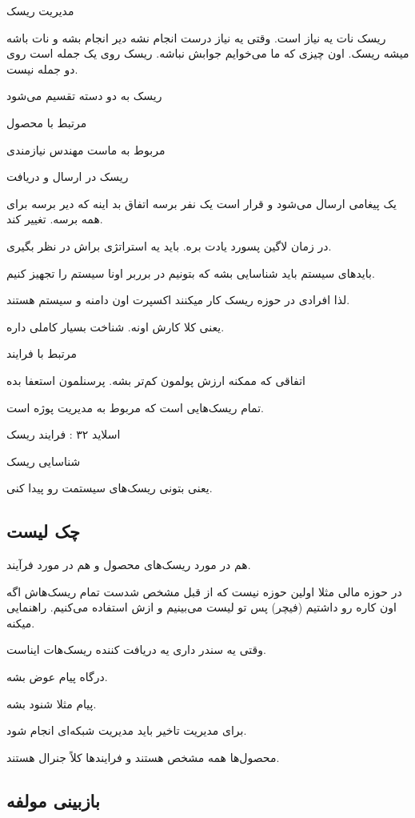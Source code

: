 
مدیریت ریسک

ریسک نات یه نیاز است. وقتی یه نیاز درست انجام نشه دیر انجام بشه و نات باشه میشه
ریسک. اون چیزی که ما می‌خوایم جوابش نباشه. ریسک روی یک جمله است روی دو جمله
نیست.

ریسک به دو دسته تقسیم می‌شود

مرتبط با محصول

مربوط به ماست
مهندس نیازمندی

ریسک در ارسال و دریافت

یک پیغامی ارسال می‌شود و قرار است یک نفر برسه
اتفاق بد اینه که دیر برسه
برای همه برسه.
تغییر کند.

در زمان لاگین پسورد یادت بره. باید یه استراتژی براش در نظر بگیری.

باید‌های سیستم باید شناسایی بشه که بتونیم در برربر اونا سیستم را تجهیز کنیم.

لذا افرادی در حوزه ریسک کار میکنند اکسپرت اون دامنه و سیستم هستند.

یعنی کلا کارش اونه. شناخت بسیار کاملی داره.

مرتبط با فرایند

اتفاقی که ممکنه ارزش پولمون کم‌تر بشه.
پرسنلمون استعفا بده

تمام ریسک‌هایی است که مربوط به مدیریت پوژه است.

اسلاید ۳۲ : فرایند ریسک

شناسایی ریسک

یعنی بتونی ریسک‌های سیستمت رو پیدا کنی.

\subsection{چک لیست}

هم در مورد ریسک‌های محصول و هم در مورد فرآیند.

در حوزه مالی مثلا اولین حوزه نیست که از قبل مشخص شدست تمام ریسک‌هاش
اگه اون کاره رو داشتیم (فیچر) پس تو لیست می‌بینیم و ازش استفاده می‌کنیم.
راهنمایی میکنه.

وقتی یه سندر داری یه دریافت کننده ریسک‌هات ایناست.

درگاه پیام عوض بشه.

پیام مثلا شنود بشه.

برای مدیریت تاخیر باید مدیریت شبکه‌ای انجام شود.

محصول‌ها همه مشخص هستند و فرایند‌ها کلاً جنرال هستند.


\subsection{بازبینی مولفه}

